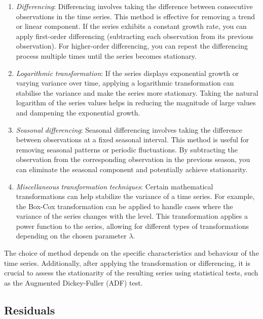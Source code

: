 \documentclass[
]{article}
\providecommand{\tightlist}{%
  \setlength{\itemsep}{0pt}\setlength{\parskip}{0pt}}
\begin{document}
\begin{enumerate}
\def\labelenumi{\arabic{enumi}.}
\tightlist
\item
  \emph{Differencing}: Differencing involves taking the difference
  between consecutive observations in the time series. This method is
  effective for removing a trend or linear component. If the series
  exhibits a constant growth rate, you can apply first-order
  differencing (subtracting each observation from its previous
  observation). For higher-order differencing, you can repeat the
  differencing process multiple times until the series becomes
  stationary.~
\item
  \emph{Logarithmic} \emph{transformation}: If the series displays
  exponential growth or varying variance over time, applying a
  logarithmic transformation can stabilise the variance and make the
  series more stationary. Taking the natural logarithm of the series
  values helps in reducing the magnitude of large values and dampening
  the exponential growth.
\item
  \emph{Seasonal} \emph{differencing}: Seasonal differencing involves
  taking the difference between observations at a fixed seasonal
  interval. This method is useful for removing seasonal patterns or
  periodic fluctuations. By subtracting the observation from the
  corresponding observation in the previous season, you can eliminate
  the seasonal component and potentially achieve stationarity.~
\item
  \emph{Miscellaneous} \emph{transformation} \emph{techniques}: Certain
  mathematical transformations can help stabilize the variance of a time
  series. For example, the Box-Cox transformation can be applied to
  handle cases where the variance of the series changes with the level.
  This transformation applies a power function to the series, allowing
  for different types of transformations depending on the chosen
  parameter \(\lambda\).
\end{enumerate}

The choice of method depends on the specific characteristics and
behaviour of the time series. Additionally, after applying the
transformation or differencing, it is crucial to assess the stationarity
of the resulting series using statistical tests, such as the Augmented
Dickey-Fuller (ADF) test.

\hypertarget{residuals}{%
\subsection{Residuals}\label{residuals}}
\end{document}
